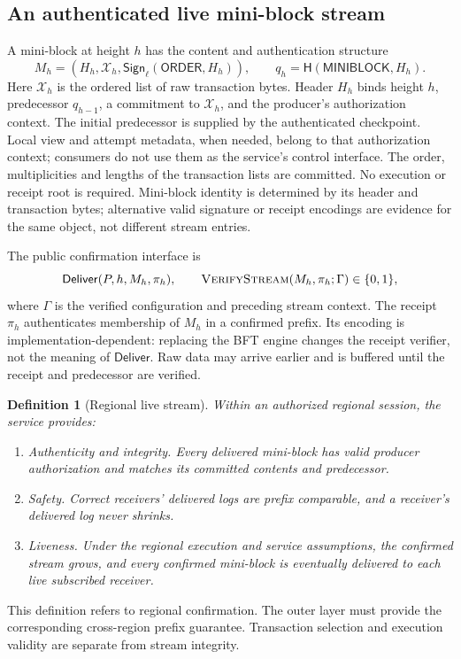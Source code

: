 \documentclass[11pt,a4paper,onecolumn]{article}
\newcommand{\Hash}{\mathsf H}
\newcommand{\Sig}{\mathsf{Sign}}
\newcommand{\Tag}[1]{\ensuremath{\mathsf{#1}}}
\newcommand{\Proc}[1]{\textnormal{\textsc{#1}}}
\newtheorem{definition}{Definition}[section]
\begin{document}
\subsection{An authenticated live mini-block stream}\label{sec:stream}
A mini-block at height $h$ has the content and authentication structure
\[
 M_h=(H_h,\mathcal X_h,\Sig_\ell(\Tag{ORDER},H_h)),
 \qquad q_h=\Hash(\Tag{MINIBLOCK},H_h).
\]
Here $\mathcal X_h$ is the ordered list of raw transaction bytes. Header $H_h$
binds height $h$, predecessor $q_{h-1}$, a commitment to $\mathcal X_h$, and
the producer's authorization context. The initial predecessor is supplied by
the authenticated checkpoint. Local view and attempt metadata, when needed,
belong to that authorization context; consumers do not use them as the
service's control interface. The order, multiplicities and lengths of the
transaction lists are committed. No execution or receipt root is required.
Mini-block identity is determined by its header and transaction bytes;
alternative valid signature or receipt encodings are evidence for the same
object, not different stream entries.

The public confirmation interface is
\[
 \Tag{Deliver}(P,h,M_h,\pi_h),\qquad
 \Proc{VerifyStream}(M_h,\pi_h;\Gamma)\in\{0,1\},
\]
where $\Gamma$ is the verified configuration and preceding stream context.
The receipt $\pi_h$ authenticates membership of $M_h$ in a confirmed prefix.
Its encoding is implementation-dependent: replacing the BFT engine changes
the receipt verifier, not the meaning of \Tag{Deliver}. Raw data may arrive
earlier and is buffered until the receipt and predecessor are verified.

\begin{definition}[Regional live stream]\label{def:stream}
Within an authorized regional session, the service provides:
\begin{enumerate}[label=(\roman*)]
\item \emph{Authenticity and integrity.} Every delivered mini-block has valid
producer authorization and matches its committed contents and predecessor.
\item \emph{Safety.} Correct receivers' delivered logs are prefix comparable,
and a receiver's delivered log never shrinks.
\item \emph{Liveness.} Under the regional execution and service assumptions,
the confirmed stream grows, and every confirmed mini-block is eventually
delivered to each live subscribed receiver.
\end{enumerate}
\end{definition}
This definition refers to regional confirmation. The outer layer must provide
the corresponding cross-region prefix guarantee. Transaction selection and
execution validity are separate from stream integrity.
\end{document}

